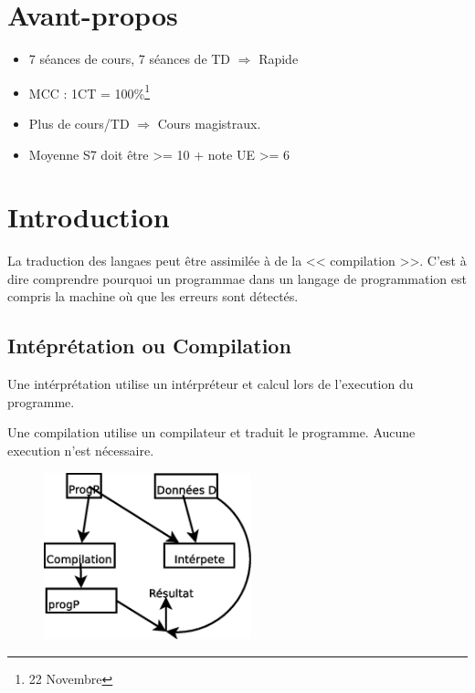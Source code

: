 \documentclass[12pt,a4paper,openany]{book}
\begin{document}
	\thispagestyle{empty} %
	\titleBC 
	\dominitoc
	\setcounter{tocdepth}{1}
	\setcounter{secnumdepth}{3}
	\setcounter{minitocdepth}{1}
	\chapter*{Avant-propos}
	\begin{attention}
		\begin{itemize}
			\item 7 séances de cours, 7 séances de TD $\Rightarrow$ Rapide
			\item MCC : 1CT = 100\%\footnote{22 Novembre}
			\item Plus de cours/TD $\Rightarrow$  Cours magistraux.
			\item Moyenne S7 doit être >= 10 + note UE >= 6
		\end{itemize}
	\end{attention}
	\tableofcontents
	\chapter{Introduction}
	La traduction des langaes peut être assimilée à de la << compilation >>.  C'est à dire comprendre pourquoi un programmae dans un langage de programmation est compris la machine où que les erreurs sont détectés.

	\section{Intéprétation ou Compilation}
	Une intérprétation utilise un intérpréteur et calcul lors de l'execution du programme.

	Une compilation utilise un compilateur et traduit le programme. Aucune execution n'est nécessaire. 
	\begin{figure}[H]
		\centering
		\includegraphics[width=6cm]{Diagramme2.eps}
	\end{figure}
\end{document}
